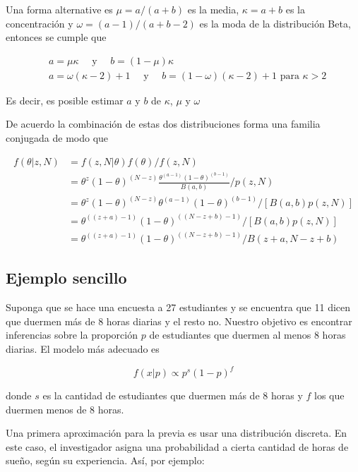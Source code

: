 \documentclass[
  12pt,
]{book}
\theoremstyle{definition}
\theoremstyle{definition}
\theoremstyle{definition}
\theoremstyle{remark}
\begin{document}
Una forma alternative es \(\mu=a /(a+b)\) es la media, \(\kappa=a+b\)
es la concentración y \(\omega=(a-1) /(a+b-2)\) es la moda de la
distribución Beta, entonces se cumple que

\begin{align*}
          & a=\mu \kappa \quad \text { y } \quad b=(1-\mu) \kappa                                         \\
          & a=\omega(\kappa-2)+1 \quad \text { y } \quad b=(1-\omega)(\kappa-2)+1 \text { para } \kappa>2
\end{align*}

Es decir, es posible estimar \(a\) y \(b\) de \(\kappa\), \(\mu\) y \(\omega\)

De acuerdo la combinación de estas dos distribuciones forma una familia conjugada de modo que

\begin{align*}
        f(\theta | z, N)
          & = f(z, N | \theta) f(\theta) / f(z, N)
        \quad                                              \\
          & = \theta^{z}(1-\theta)^{(N-z)} \frac{\theta^{(a-1)}(1-\theta)^{(b-1)}}{B(a, b)} / p(z, N) \\
          & = \theta^{z}(1-\theta)^{(N-z)} \theta^{(a-1)}(1-\theta)^{(b-1)} /[B(a, b) p(z, N)]        \\
          & = \theta^{((z+a)-1)}(1-\theta)^{((N-z+b)-1)} /[B(a, b) p(z, N)]                           \\
          & = \theta^{((z+a)-1)}(1-\theta)^{((N-z+b)-1)} / B(z+a, N-z+b)
\end{align*}

\hypertarget{ejemplo-sencillo}{%
\subsection{Ejemplo sencillo}\label{ejemplo-sencillo}}

Suponga que se hace una encuesta a 27 estudiantes y se encuentra que
11 dicen que duermen más de 8 horas diarias y el resto no. Nuestro
objetivo es encontrar inferencias sobre la proporción \(p\) de
estudiantes que duermen al menos 8 horas diarias. El modelo más
adecuado es

\[
        f(x \vert p) \propto p^s (1-p)^f
\]

donde \(s\) es la cantidad de estudiantes que duermen más de 8 horas y
\(f\) los que duermen menos de 8 horas.

Una primera aproximación para la previa es usar una distribución
discreta. En este caso, el investigador asigna una probabilidad a
cierta cantidad de horas de sueño, según su experiencia. Así, por
ejemplo:
\end{document}

